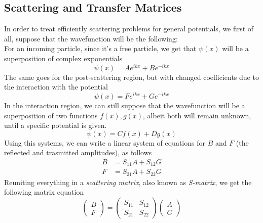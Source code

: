 \documentclass[a4paper, 11pt]{book}
\newcommand{\1}{\opr{\mathds{1}}}
\theoremstyle{plain}
\begin{document}
	\subsection{Scattering and Transfer Matrices}
	In order to treat efficiently scattering problems for general potentials, we first of all, suppose that the wavefunction will be the following:\\
	For an incoming particle, since it's a free particle, we get that $\psi(x)$ will be a superposition of complex exponentials
	\begin{equation}
		\psi(x)=Ae^{ikx}+Be^{-ikx}
		\label{eq:incomingscattering}
	\end{equation}
	The same goes for the post-scattering region, but with changed coefficients due to the interaction with the potential
	\begin{equation}
		\psi(x)=Fe^{ikx}+Ge^{-ikx}
		\label{eq:outgoingscattering}
	\end{equation}
	In the interaction region, we can still suppose that the wavefunction will be a superposition of two functions $f(x),g(x)$, albeit both will remain unknown, until a specific potential is given.
	\begin{equation}
		\psi(x)=Cf(x)+Dg(x)
		\label{eq:scatteringregion}
	\end{equation}
	Using this systems, we can write a linear system of equations for $B$ and $F$ (the reflected and trasmitted amplitudes), as follows
	\begin{equation}
		\begin{aligned}
			B&=S_{11}A+S_{12}G\\
			F&=S_{21}A+S_{22}G
		\end{aligned}
		\label{eq:scatteringsystem}
	\end{equation}
	Reuniting everything in a \textit{scattering matrix}, also known as \textit{S-matrix}, we get the following matrix equation
	\begin{equation}
		\begin{pmatrix}
			B\\
			F
		\end{pmatrix}=\begin{pmatrix}
			S_{11}&S_{12}\\
			S_{21}&S_{22}
		\end{pmatrix}\begin{pmatrix}
			A\\
			G
		\end{pmatrix}
		\label{eq:scatteringmatrix}
	\end{equation}
\end{document}
